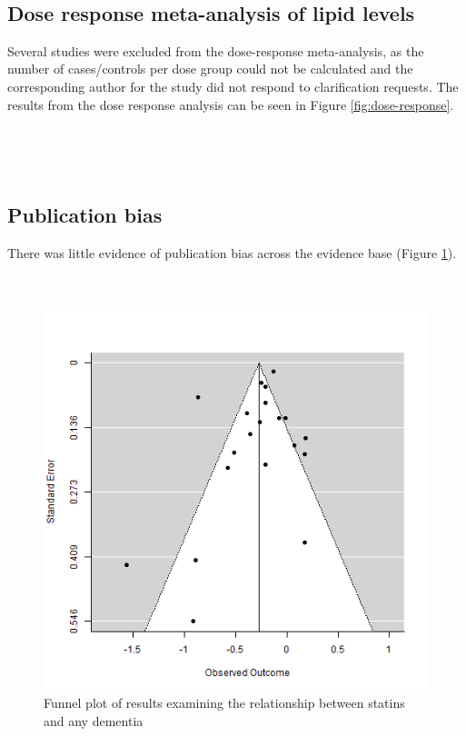 \documentclass[a4paper, twoside]{templates/ociamthesis}
\begin{document}
~

\hypertarget{dose-response-results}{%
\subsection{Dose response meta-analysis of lipid levels}\label{dose-response-results}}

Several studies were excluded from the dose-response meta-analysis, as the number of cases/controls per dose group could not be calculated and the corresponding author for the study did not respond to clarification requests. The results from the dose response analysis can be seen in Figure \ref{fig:dose-response}.

~

~

\hypertarget{sys-rev-pub-bias}{%
\subsection{Publication bias}\label{sys-rev-pub-bias}}

There was little evidence of publication bias across the evidence base (Figure \ref{fig:funnelStatinsAny}).

~




\begin{figure}[H]
\includegraphics[width=1\linewidth]{figures/sys-rev/funnel_statins_any} \caption[Funnel plot of results examining the relationship between statins and any dementia]{Funnel plot of results examining the relationship between statins and any dementia}\label{fig:funnelStatinsAny}
\end{figure}
\end{document}
